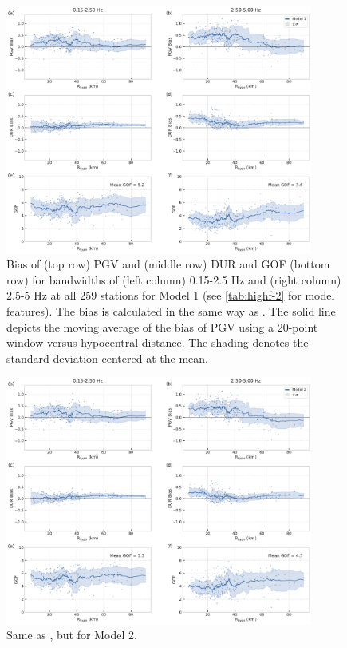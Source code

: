 

\begin{figure}[!ht]
  \centering
  \includegraphics[width=0.9\textwidth,height=0.9\textheight,keepaspectratio]{figures/figure_highf_S11.pdf}
  \caption{Bias of (top row) PGV and (middle row) DUR and GOF (bottom row) for bandwidths of (left column) 0.15-2.5 Hz and (right column) 2.5-5 Hz at all 259 stations for Model 1 (see \cref{tab:highf-2} for model features). The bias is calculated in the same way as . The solid line depicts the moving average of the bias of PGV using a 20-point window versus hypocentral distance. The shading denotes the standard deviation centered at the mean.
  }
  \label{fig:highf-S11}
\end{figure}
\clearpage

\begin{figure}[!ht]
  \centering
  \includegraphics[width=0.9\textwidth,height=0.9\textheight,keepaspectratio]{figures/figure_highf_S12.pdf}
  \caption{Same as , but for Model 2.
  }
\label{fig:highf-S12}
\end{figure}
\clearpage


